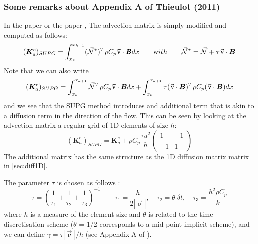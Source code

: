 \subsubsection{Some remarks about Appendix A of Thieulot (2011) \cite{thie11}}
\label{ss:appAthie11}

In the \douar paper \cite{brtf08} or the \fantom paper \cite{thie11},
The advection matrix is simply modified and computed as follows:
\[
({\bm K}_a^e)_{SUPG}
=
\int_{x_k}^{x_{k+1}}   ({\vec {{\mathcal{N}}}}^\star)^T \rho C_p \vec\upnu \cdot {\bm B} dx  
\quad\quad
{\text with}
\quad\quad
{\vec {{\mathcal{N}}}}^\star= {\vec {{\mathcal{N}}}} + \tau \vec \upnu \cdot {\bm B}
\]
Note that we can also write 
\[
({\bm K}_a^e)_{SUPG}
=
\int_{x_k}^{x_{k+1}}   {\vec {{\mathcal{N}}}}^T \rho C_p \vec\upnu \cdot {\bm B} dx  
+
\int_{x_k}^{x_{k+1}}  \tau (\vec \upnu \cdot {\bm B})^T   \rho C_p (\vec\upnu \cdot {\bm B}) dx  
\]
and we see that the SUPG method introduces and additional term that is akin to 
a diffusion term in the direction of the flow.
This can be seen by looking at the advection matrix a regular grid of 1D 
elements of size $h$:
\[
({\bm K}_a^e)_{SUPG}=
{\bm K}_a^e
+
\rho C_p
\frac{\tau u^2}{h}
\left(
\begin{array}{cc}
1 & -1 \\ \\
-1 & 1
\end{array}
\right)
\]
The additional matrix has the same structure as the 1D diffusion matrix matrix in \ref{sec:diff1D}.

The parameter $\tau$ is chosen as follows \cite{teos00}:
\begin{equation}
\tau= \left(\frac{1}{\tau_1} + \frac{1}{\tau_2} + \frac{1}{\tau_3} \right)^{-1}
\qquad
\tau_1=\frac{h}{2 |\vec\upnu|},
\quad
\tau_2 = \theta \; \delta t,
\quad
\tau_3 = \frac{h^2 \rho C_p}{k}
\label{tausupg}
\end{equation}
where $h$ is a measure of the element size and $\theta$ is related to the time
discretisation scheme ($\theta$ = 1/2 corresponds to a mid-point implicit scheme),
and we can define $\gamma=\tau |\vec\upnu|/h$ (see Appendix A of \cite{thie11}). 

